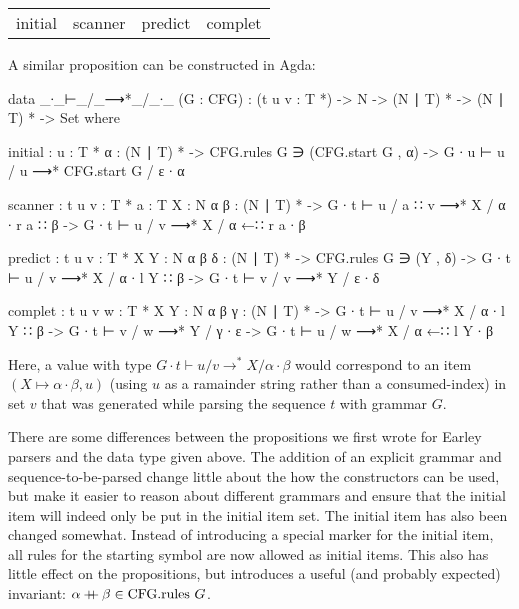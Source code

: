 		\begin{table}[h]
			\centering
			\begin{tabular}{cccc}
				initial & scanner & predict & complet
			\end{tabular}
		\end{table}

		A similar proposition can be constructed in Agda:

		\begin{code}

			data _∙_⊢_/_⟶*_/_∙_ (G : CFG) :
			  (t u v : T *) -> N -> (N ∣ T) * -> (N ∣ T) * -> Set where
			
			  initial : {u : T *} {α : (N ∣ T) *} ->
			    CFG.rules G ∋ (CFG.start G , α) ->
			    G ∙ u ⊢ u / u ⟶* CFG.start G / ε ∙ α
			
			  scanner : {t u v : T *} {a : T} {X : N} {α β : (N ∣ T) *} ->
			    G ∙ t ⊢ u / a ∷ v ⟶* X / α ∙ r a ∷ β ->
			      G ∙ t ⊢ u / v ⟶* X / α ←∷ r a ∙ β
			
			  predict : {t u v : T *} {X Y : N} {α β δ : (N ∣ T) *} -> 
			    CFG.rules G ∋ (Y , δ) ->
			    G ∙ t ⊢ u / v ⟶* X / α ∙ l Y ∷ β ->
			      G ∙ t ⊢ v / v ⟶* Y / ε ∙ δ
			
			  complet : {t u v w : T *} {X Y : N} {α β γ : (N ∣ T) *} ->
			    G ∙ t ⊢ u / v ⟶* X / α ∙ l Y ∷ β ->
			    G ∙ t ⊢ v / w ⟶* Y / γ ∙ ε ->
			      G ∙ t ⊢ u / w ⟶* X / α ←∷ l Y ∙ β

		\end{code}

		Here, a value with type $G \cdot t \vdash u / v \rightarrow^* X /
		\alpha \cdot \beta$ would correspond to an item $(X \mapsto \alpha
		\cdot \beta, u)$ (using $u$ as a ramainder string rather than a
		consumed-index) in set $v$ that was generated while parsing the
		sequence $t$ with grammar $G$. 
		
		There are some differences between the propositions we first wrote for
		Earley parsers and the data type given above. The addition of an
		explicit grammar and sequence-to-be-parsed change little about the how
		the constructors can be used, but make it easier to reason about
		different grammars and ensure that the initial item will indeed only be
		put in the initial item set. The initial item has also been changed
		somewhat. Instead of introducing a special marker for the initial item,
		all rules for the starting symbol are now allowed as initial items.
		This also has little effect on the propositions, but introduces a
		useful (and probably expected) invariant: $\alpha \mathbin{{+}\mspace{-8mu}{+}} \beta \in 
		\textrm{CFG.rules } G$.
	
